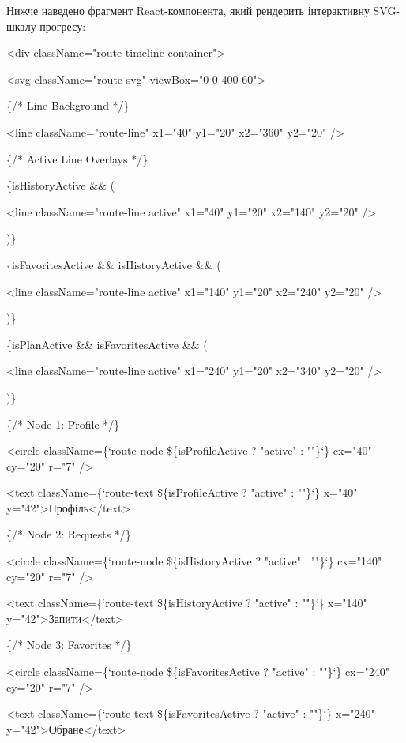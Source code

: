 \documentclass[
]{article}
\begin{document}
Нижче наведено фрагмент React-компонента, який рендерить інтерактивну
SVG-шкалу прогресу:

\textless div className="route-timeline-container"\textgreater{}

\textless svg className="route-svg" viewBox="0 0 400 60"\textgreater{}

\{/* Line Background */\}

\textless line className="route-line" x1="40" y1="20" x2="360" y2="20"
/\textgreater{}

\{/* Active Line Overlays */\}

\{isHistoryActive \&\& (

\textless line className="route-line active" x1="40" y1="20" x2="140"
y2="20" /\textgreater{}

)\}

\{isFavoritesActive \&\& isHistoryActive \&\& (

\textless line className="route-line active" x1="140" y1="20" x2="240"
y2="20" /\textgreater{}

)\}

\{isPlanActive \&\& isFavoritesActive \&\& (

\textless line className="route-line active" x1="240" y1="20" x2="340"
y2="20" /\textgreater{}

)\}

\{/* Node 1: Profile */\}

\textless circle className=\{`route-node \$\{isProfileActive ? "active"
: ""\}`\} cx="40" cy="20" r="7" /\textgreater{}

\textless text className=\{`route-text \$\{isProfileActive ? "active" :
""\}`\} x="40" y="42"\textgreater Профіль\textless/text\textgreater{}

\{/* Node 2: Requests */\}

\textless circle className=\{`route-node \$\{isHistoryActive ? "active"
: ""\}`\} cx="140" cy="20" r="7" /\textgreater{}

\textless text className=\{`route-text \$\{isHistoryActive ? "active" :
""\}`\} x="140" y="42"\textgreater Запити\textless/text\textgreater{}

\{/* Node 3: Favorites */\}

\textless circle className=\{`route-node \$\{isFavoritesActive ?
"active" : ""\}`\} cx="240" cy="20" r="7" /\textgreater{}

\textless text className=\{`route-text \$\{isFavoritesActive ? "active"
: ""\}`\} x="240" y="42"\textgreater Обране\textless/text\textgreater{}
\end{document}
